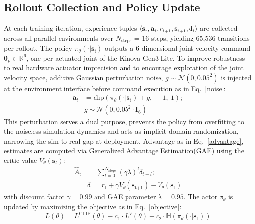 \documentclass[preprint,12pt]{elsarticle}
\begin{document}
\subsection{Rollout Collection and Policy Update}
\label{rollout}
At each training iteration, experience tuples $\langle \mathbf{s}_\text{t}, \mathbf{a}_\text{t}, r_\text{t+1}, \mathbf{s}_\text{t+1}, \text{d}_{\text{t}} \rangle$ are collected across all parallel environments over $N_\text{steps}$ = 16 steps, yielding 65,536 transitions per rollout. The policy $\pi_\theta(\cdot|\mathbf{s}_\text{t})$ outputs a 6-dimensional joint velocity command $\dot{\boldsymbol{\theta}_{p}} \in \mathbb{R}^6$, one per actuated joint of the Kinova Gen3 Lite. To improve robustness to real hardware actuator imprecision and to encourage exploration of the joint velocity space, additive Gaussian perturbation noise, $g \sim \mathcal{N}(0, 0.05^2)$ is injected at the environment interface before command execution as in Eq.~\ref{noise}:  
\begin{equation}
\begin{split}
    \mathbf{a}_t &= \text{clip}\left(\pi_{\theta}(\cdot|\mathbf{s}_\text{t}) + g,\ -1,\ 1\right); \\ 
    & g \sim \mathcal{N}(0, 
    0.05^2\cdot\mathbf{I}_6)
\end{split}
\label{noise}
\end{equation}
This perturbation serves a dual purpose, prevents the policy from overfitting to the noiseless simulation dynamics and acts as implicit domain randomization, narrowing the sim-to-real gap at deployment. Advantage as in Eq.~\ref{advantage}, estimates are computed via Generalized Advantage Estimation(GAE) using the critic value $V_\theta(\mathbf{s}_t)$:
\begin{equation}
\begin{split}
    \hat{A}_\text{t} &= \sum_{l=0}^{N_\text{steps}} (\gamma\lambda)^l \delta_{t+l}; \\
    & \delta_\text{t} = r_\text{t} + \gamma V_\theta(\mathbf{s}_\text{t+1}) - V_\theta(\mathbf{s}_\text{t})
\end{split}
\label{advantage}
\end{equation}
with discount factor $\gamma = 0.99$ and GAE parameter $\lambda = 0.95$. The actor $\pi_\theta$
is updated by maximizing the objective as in Eq.~\ref{objective}:
\begin{equation}
L(\theta) = L^{\text{CLIP}}(\theta) - c_{1}\cdot L^{V}(\theta) + c_{2} \cdot\mathbb{H}(\pi_\theta(\cdot|\mathbf{s}_\text{t}))
\label{objective}
\end{equation}
\end{document}
